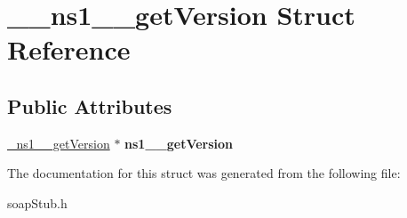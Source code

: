 \hypertarget{struct____ns1____getVersion}{
\section{\_\-\_\-ns1\_\-\_\-getVersion Struct Reference}
\label{struct____ns1____getVersion}
}
\subsection*{Public Attributes}
\begin{DoxyCompactItemize}
\item 
\hypertarget{struct____ns1____getVersion_a7e5327052b72dadcc71092eb082ce157}{
\hyperlink{class__ns1____getVersion}{\_\-ns1\_\-\_\-getVersion} $\ast$ {\bfseries ns1\_\-\_\-getVersion}}
\label{struct____ns1____getVersion_a7e5327052b72dadcc71092eb082ce157}

\end{DoxyCompactItemize}


The documentation for this struct was generated from the following file:\begin{DoxyCompactItemize}
\item 
soapStub.h\end{DoxyCompactItemize}
